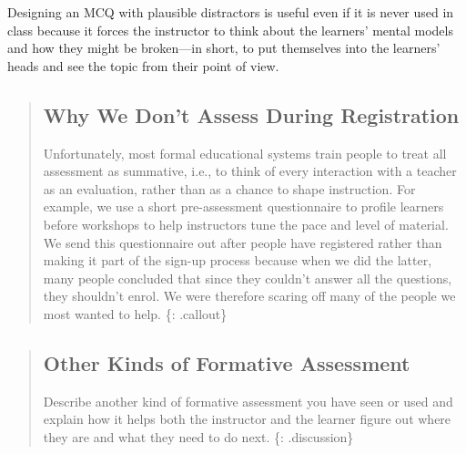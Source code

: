 Designing an MCQ with plausible distractors is useful even if it is
never used in class because it forces the instructor to think about the
learners' mental models and how they might be broken---in short, to put
themselves into the learners' heads and see the topic from their point
of view.

\begin{quote}
\subsection{Why We Don't Assess During
Registration}\label{why-we-dont-assess-during-registration}

Unfortunately, most formal educational systems train people to treat all
assessment as summative, i.e., to think of every interaction with a
teacher as an evaluation, rather than as a chance to shape instruction.
For example, we use a short pre-assessment questionnaire to profile
learners before workshops to help instructors tune the pace and level of
material. We send this questionnaire out after people have registered
rather than making it part of the sign-up process because when we did
the latter, many people concluded that since they couldn't answer all
the questions, they shouldn't enrol. We were therefore scaring off many
of the people we most wanted to help. \{: .callout\}
\end{quote}

\begin{quote}
\subsection{Other Kinds of Formative
Assessment}\label{other-kinds-of-formative-assessment}

Describe another kind of formative assessment you have seen or used and
explain how it helps both the instructor and the learner figure out
where they are and what they need to do next. \{: .discussion\}
\end{quote}
